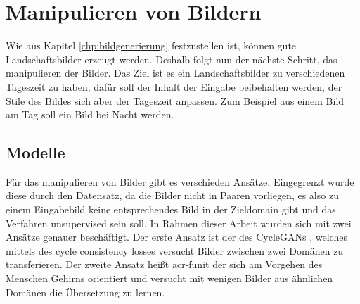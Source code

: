 \chapter{Manipulieren von Bildern}\label{chp:bildmanipulation} %
\glsresetall

 Wie aus Kapitel \ref{chp:bildgenerierung} festzustellen ist, können gute Landschaftsbilder erzeugt werden. Deshalb folgt nun der nächste Schritt, das manipulieren der Bilder. Das Ziel ist es ein Landschaftsbilder zu verschiedenen Tageszeit zu haben, dafür soll der Inhalt der Eingabe beibehalten werden,  der Stile des Bildes sich aber der Tageszeit anpassen. Zum Beispiel aus einem Bild am Tag soll ein Bild bei Nacht werden.
 
 \section{Modelle} %
 Für das manipulieren von Bilder gibt es verschieden Ansätze. Eingegrenzt wurde diese durch den Datensatz, da die Bilder nicht in Paaren vorliegen, es also zu einem Eingabebild keine entsprechendes Bild in der Zieldomain gibt und das Verfahren unsupervised sein soll. %
 In Rahmen dieser Arbeit wurden sich mit  zwei Ansätze genauer beschäftigt. Der erste Ansatz ist der des CycleGANs \cite{zhu_unpaired_2020}, welches mittels des cycle consistency losses versucht Bilder zwischen zwei Domänen zu transferieren. Der zweite Ansatz heißt  \gls{acr-funit} \cite{liu_few-shot_2019} der sich am Vorgehen des Menschen Gehirns orientiert und versucht mit wenigen Bilder aus ähnlichen Domänen die Übersetzung zu lernen.
 
